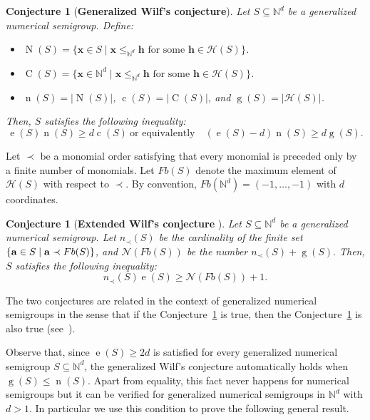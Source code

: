 \documentclass[12pt]{amsart}
\theoremstyle{plain}
\theoremstyle{theorem}
\newtheorem{conjecture}[definition]{Conjecture}
\theoremstyle{remark}
\begin{document}
\begin{conjecture}[{\bf Generalized Wilf's conjecture}{\cite{Cisto-et-al2020}}]\label{GenWilf}
Let $S\subseteq \mathbb{N}^d$ be a generalized numerical semigroup. Define:
\begin{itemize}
	\item $\operatorname{N}(S)=\{\mathbf{x}\in S\mid \mathbf{x}\leq_{\mathbb{N}^d} \mathbf{h}\text{ for some }\mathbf{h}\in  \mathcal{H}(S)\}$.
	\item $\operatorname{C}(S)=\{\mathbf{x}\in \mathbb{N}^d\mid \mathbf{x}\leq_{\mathbb{N}^d}  \mathbf{h}\text{ for some }\mathbf{h}\in  \mathcal{H}(S)\}$.
	\item $\operatorname{n}(S)=|\operatorname{N}(S)|$, $\operatorname{c}(S)=|\operatorname{C}(S)|$, and $\operatorname{g}(S) = \vert \mathcal{H}(S) \vert$.  
\end{itemize}
Then, $S$ satisfies the following inequality:
	$$\operatorname{e}(S)\operatorname{n}(S)\geq d \operatorname{c}(S)~\text{or equivalently}\quad (\operatorname{e}(S)-d)\operatorname{n}(S)\geq d \operatorname{g}(S).$$
\end{conjecture}


Let $\prec$ be a monomial order satisfying that every monomial is preceded only by a finite number of monomials. Let $Fb(S)$ denote the maximum element of $\mathcal{H}(S)$ with respect to $\prec$. By convention, $Fb(\mathbb{N}^d) = (-1,\ldots,-1)$ with $d$ coordinates. 

\begin{conjecture}[{\bf Extended Wilf's conjecture} {\cite[Conjecture 14]{garcia2018extension}}]\label{ExtWilf}
Let $S\subseteq \mathbb{N}^d$ be a generalized numerical semigroup. Let $n_{\prec}(S)$ be the cardinality of
	the finite set $\{{\bf a} \in S \mid {\bf a} \prec Fb(S)\}$, and $\mathcal{N}(Fb(S))$ be the number $n_{\prec}(S) + \operatorname{g}(S).$ Then, $S$ satisfies the following inequality:
	$$n_{\prec}(S)\operatorname{e}(S) \geq \mathcal{N}(Fb(S)) + 1.$$
\end{conjecture}


 The two conjectures are related in the context of generalized numerical semigroups in the sense that if the Conjecture~\ref{GenWilf} is true, then the Conjecture~\ref{ExtWilf} is also true (see~\cite[Proposition 6.3]{Cisto-et-al2020}). 
 
 \medskip
Observe that, since $\operatorname{e}(S)\geq 2d$ is satisfied for every generalized numerical semigroup $S\subseteq \mathbb{N}^d$, the generalized Wilf's conjecture automatically holds when $\operatorname{g}(S)\leq \operatorname{n}(S)$. Apart from equality, this fact never happens for numerical semigroups but it can be verified for generalized numerical semigroups in $\mathbb{N}^d$ with $d>1$. In particular we use this condition to prove the following general result.
\end{document}

